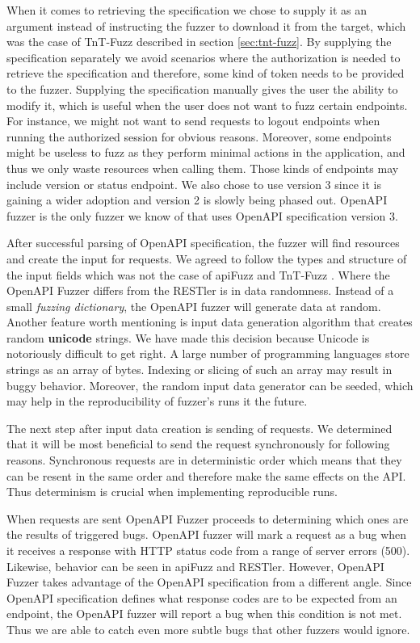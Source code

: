 When it comes to retrieving the specification we chose to supply it as an argument instead of instructing the fuzzer to download it from the target, which was the case of TnT-Fuzz described in section \ref{sec:tnt-fuzz}. By supplying the specification separately we avoid scenarios where the authorization is needed to retrieve the specification and therefore, some kind of token needs to be provided to the fuzzer. Supplying the specification manually gives the user the ability to modify it, which is useful when the user does not want to fuzz certain endpoints. For instance, we might not want to send requests to logout endpoints when running the authorized session for obvious reasons. Moreover, some endpoints might be useless to fuzz as they perform minimal actions in the application, and thus we only waste resources when calling them. Those kinds of endpoints may include version or status endpoint. We also chose to use version 3 since it is gaining a wider adoption and version 2 is slowly being phased out. OpenAPI fuzzer is the only fuzzer we know of that uses OpenAPI specification version 3.

After successful parsing of OpenAPI specification, the fuzzer will find resources and create the input for requests. We agreed to follow the types and structure of the input fields which was not the case of apiFuzz \cite{apiFuzz2020github} and TnT-Fuzz \cite{tntFuzzer2020github}. Where the OpenAPI Fuzzer differs from the RESTler \cite{atlidakis2019restler} is in data randomness. Instead of a small \textit{fuzzing dictionary}, the OpenAPI fuzzer will generate data at random. Another feature worth mentioning is input data generation algorithm that creates random \textbf{unicode} strings. We have made this decision because Unicode is notoriously difficult to get right. A large number of programming languages store strings as an array of bytes. Indexing or slicing of such an array may result in buggy behavior. Moreover, the random input data generator can be seeded, which may help in the reproducibility of fuzzer's runs it the future.

The next step after input data creation is sending of requests. We determined that it will be most beneficial to send the request synchronously for following reasons. Synchronous requests are in deterministic order which means that they can be resent in the same order and therefore make the same effects on the API. Thus determinism is crucial when implementing reproducible runs.

When requests are sent OpenAPI Fuzzer proceeds to determining which ones are the results of triggered bugs. OpenAPI fuzzer will mark a request as a bug when it receives a response with HTTP status code from a range of server errors (500). Likewise, behavior can be seen in apiFuzz and RESTler. However, OpenAPI Fuzzer takes advantage of the OpenAPI specification from a different angle. Since OpenAPI specification defines what response codes are to be expected from an endpoint, the OpenAPI fuzzer will report a bug when this condition is not met. Thus we are able to catch even more subtle bugs that other fuzzers would ignore.

